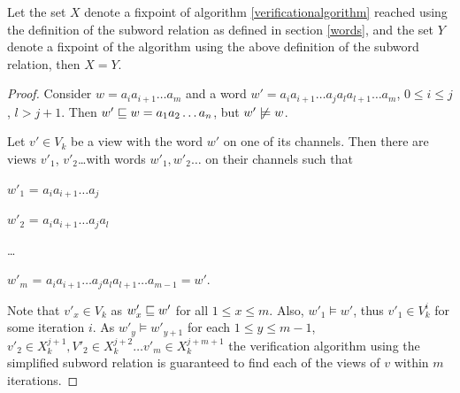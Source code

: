 \begin{lemma}
Let the set $X$ denote a fixpoint of algorithm \ref{verificationalgorithm} reached using the definition of the subword relation as defined in section \ref{words}, and the set $Y$ denote a fixpoint of the algorithm using the above definition of the subword relation, then $X=Y$.
\end{lemma}
\begin{proof}
Consider $w = a_ia_{i+1}\ldots a_m$ and a word $w' = a_ia_{i+1}\ldots a_ja_la_{l+1}\ldots a_m$, $0 \leq i \leq j$, $l > j+1$. Then $w' \sqsubseteq w = a_1a_2\ldots a_n$, but $w' \centernot\models w$.

Let $v'\in V_k$ be a view with the word $w'$ on one of its channels. Then there are views $v'_1$, $v'_2$\ldots with words $w'_1, w'_2\ldots$ on their channels such that

\hspace{10mm}
$w'_1$ =  $a_ia_{i+1}\ldots a_j$

\hspace{10mm}
$w'_2$ = $a_ia_{i+1}\ldots a_ja_l$

\hspace{10mm}
\ldots

\hspace{10mm}
$w'_{m}$ = $a_ia_{i+1}\ldots a_ja_la_{l+1}\ldots a_{m-1} = w'$.

Note that $v'_x \in V_k$ as $w'_x \sqsubseteq w'$ for all $1 \leq x \leq m$. Also, $w'_1 \models w'$, thus $v'_1 \in V_k^i$ for some iteration $i$. As $w'_y \models w'_{y+1}$ for each $1 \leq y \leq m-1$, $v'_2 \in X_k^{j+1}, V'_2 \in X_k^{j+2} \ldots v'_m \in X_k^{j+m+1}$ the verification algorithm using the simplified subword relation is guaranteed to find each of the views of $v$ within $m$ iterations.

\end{proof}


